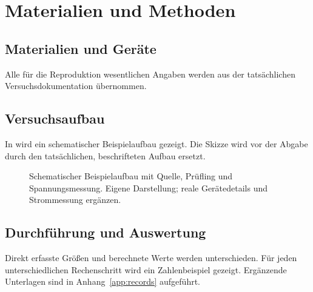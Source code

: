 \chapter{Materialien und Methoden}
\label{chap:methods}

\begin{mcimethods}
\section{Materialien und Geräte}
Alle für die Reproduktion wesentlichen Angaben werden aus der tatsächlichen
Versuchsdokumentation übernommen.

\section{Versuchsaufbau}
In  wird ein schematischer Beispielaufbau gezeigt.
Die Skizze wird vor der Abgabe durch den tatsächlichen, beschrifteten
Aufbau ersetzt.
\begin{figure}[htbp]
  \centering
  \caption[Beispiel einer Versuchsskizze]{Schematischer Beispielaufbau mit
    Quelle, Prüfling und Spannungsmessung. Eigene Darstellung; reale
    Gerätedetails und Strommessung ergänzen.}
  \label{fig:setup}
\end{figure}

\section{Durchführung und Auswertung}
Direkt erfasste Größen und berechnete Werte werden unterschieden.
Für jeden unterschiedlichen Rechenschritt wird ein Zahlenbeispiel gezeigt.
Ergänzende Unterlagen sind in Anhang~\ref{app:records} aufgeführt.
\end{mcimethods}
